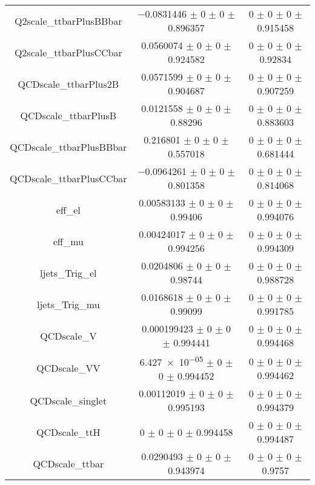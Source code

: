 \begin{table}
\begin{tabular}{ccc}
Q2scale\_ttbarPlusBBbar & \num{-0.0831446} $\pm$ \num{0} $\pm$ \num{0} $\pm$ \num{0.896357} & \num{0} $\pm$ \num{0} $\pm$ \num{0} $\pm$ \num{0.915458}\\
Q2scale\_ttbarPlusCCbar & \num{0.0560074} $\pm$ \num{0} $\pm$ \num{0} $\pm$ \num{0.924582} & \num{0} $\pm$ \num{0} $\pm$ \num{0} $\pm$ \num{0.92834}\\
QCDscale\_ttbarPlus2B & \num{0.0571599} $\pm$ \num{0} $\pm$ \num{0} $\pm$ \num{0.904687} & \num{0} $\pm$ \num{0} $\pm$ \num{0} $\pm$ \num{0.907259}\\
QCDscale\_ttbarPlusB & \num{0.0121558} $\pm$ \num{0} $\pm$ \num{0} $\pm$ \num{0.88296} & \num{0} $\pm$ \num{0} $\pm$ \num{0} $\pm$ \num{0.883603}\\
QCDscale\_ttbarPlusBBbar & \num{0.216801} $\pm$ \num{0} $\pm$ \num{0} $\pm$ \num{0.557018} & \num{0} $\pm$ \num{0} $\pm$ \num{0} $\pm$ \num{0.681444}\\
QCDscale\_ttbarPlusCCbar & \num{-0.0964261} $\pm$ \num{0} $\pm$ \num{0} $\pm$ \num{0.801358} & \num{0} $\pm$ \num{0} $\pm$ \num{0} $\pm$ \num{0.814068}\\
eff\_el & \num{0.00583133} $\pm$ \num{0} $\pm$ \num{0} $\pm$ \num{0.99406} & \num{0} $\pm$ \num{0} $\pm$ \num{0} $\pm$ \num{0.994076}\\
eff\_mu & \num{0.00424017} $\pm$ \num{0} $\pm$ \num{0} $\pm$ \num{0.994256} & \num{0} $\pm$ \num{0} $\pm$ \num{0} $\pm$ \num{0.994309}\\
ljets\_Trig\_el & \num{0.0204806} $\pm$ \num{0} $\pm$ \num{0} $\pm$ \num{0.98744} & \num{0} $\pm$ \num{0} $\pm$ \num{0} $\pm$ \num{0.988728}\\
ljets\_Trig\_mu & \num{0.0168618} $\pm$ \num{0} $\pm$ \num{0} $\pm$ \num{0.99099} & \num{0} $\pm$ \num{0} $\pm$ \num{0} $\pm$ \num{0.991785}\\
QCDscale\_V & \num{0.000199423} $\pm$ \num{0} $\pm$ \num{0} $\pm$ \num{0.994441} & \num{0} $\pm$ \num{0} $\pm$ \num{0} $\pm$ \num{0.994468}\\
QCDscale\_VV & \num{6.427e-05} $\pm$ \num{0} $\pm$ \num{0} $\pm$ \num{0.994452} & \num{0} $\pm$ \num{0} $\pm$ \num{0} $\pm$ \num{0.994462}\\
QCDscale\_singlet & \num{0.00112019} $\pm$ \num{0} $\pm$ \num{0} $\pm$ \num{0.995193} & \num{0} $\pm$ \num{0} $\pm$ \num{0} $\pm$ \num{0.994379}\\
QCDscale\_ttH & \num{0} $\pm$ \num{0} $\pm$ \num{0} $\pm$ \num{0.994458} & \num{0} $\pm$ \num{0} $\pm$ \num{0} $\pm$ \num{0.994487}\\
QCDscale\_ttbar & \num{0.0290493} $\pm$ \num{0} $\pm$ \num{0} $\pm$ \num{0.943974} & \num{0} $\pm$ \num{0} $\pm$ \num{0} $\pm$ \num{0.9757}\\

\end{tabular}
\end{table}
